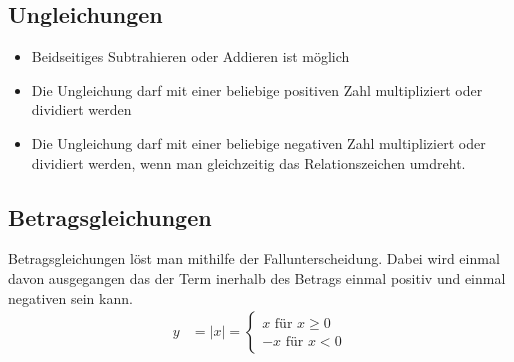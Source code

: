 \subsection{Ungleichungen}
\begin{itemize}
\item Beidseitiges Subtrahieren oder Addieren ist möglich
\item Die Ungleichung darf mit einer beliebige positiven Zahl multipliziert oder dividiert werden
\item Die Ungleichung darf mit einer beliebige negativen Zahl multipliziert oder dividiert werden, wenn man gleichzeitig das Relationszeichen umdreht.
\end{itemize}

\subsection{Betragsgleichungen}
Betragsgleichungen löst man mithilfe der Fallunterscheidung. Dabei wird einmal davon ausgegangen das der Term inerhalb des Betrags einmal positiv und einmal negativen
sein kann.
\begin{align*}
y&=|x|=
\begin{cases}
x \text{ für } x \geq 0 \\
-x \text{ für } x < 0
\end{cases}
\end{align*}